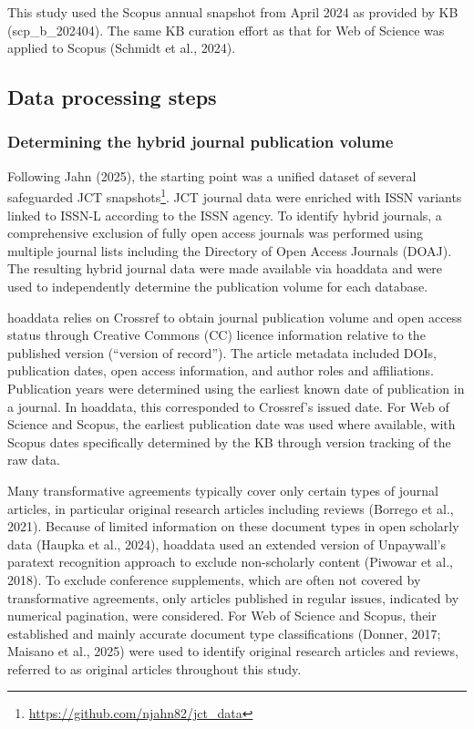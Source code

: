 \documentclass[a4paper,man,floatsintext,longtable,noextraspace,10pt]{apa6}
\begin{document}
This study used the Scopus annual snapshot from April 2024 as provided
by KB (scp\_b\_202404). The same KB curation effort as that for Web of
Science was applied to Scopus (Schmidt et al., 2024).

\subsection{Data processing steps}\label{data-processing-steps}

\subsubsection{Determining the hybrid journal publication
volume}\label{determining-the-hybrid-journal-publication-volume}

Following Jahn (2025), the starting point was a unified dataset of
several safeguarded JCT snapshots\footnote{\url{https://github.com/njahn82/jct_data}}.
JCT journal data were enriched with ISSN variants linked to ISSN-L
according to the ISSN agency. To identify hybrid journals, a
comprehensive exclusion of fully open access journals was performed
using multiple journal lists including the Directory of Open Access
Journals (DOAJ). The resulting hybrid journal data were made available
via hoaddata and were used to independently determine the publication
volume for each database.

hoaddata relies on Crossref to obtain journal publication volume and
open access status through Creative Commons (CC) licence information
relative to the published version (``version of record''). The article
metadata included DOIs, publication dates, open access information, and
author roles and affiliations. Publication years were determined using
the earliest known date of publication in a journal. In hoaddata, this
corresponded to Crossref's issued date. For Web of Science and Scopus,
the earliest publication date was used where available, with Scopus
dates specifically determined by the KB through version tracking of the
raw data.

Many transformative agreements typically cover only certain types of
journal articles, in particular original research articles including
reviews (Borrego et al., 2021). Because of limited information on these
document types in open scholarly data (Haupka et al., 2024), hoaddata
used an extended version of Unpaywall's paratext recognition approach to
exclude non-scholarly content (Piwowar et al., 2018). To exclude
conference supplements, which are often not covered by transformative
agreements, only articles published in regular issues, indicated by
numerical pagination, were considered. For Web of Science and Scopus,
their established and mainly accurate document type classifications
(Donner, 2017; Maisano et al., 2025) were used to identify original
research articles and reviews, referred to as original articles
throughout this study.
\end{document}
